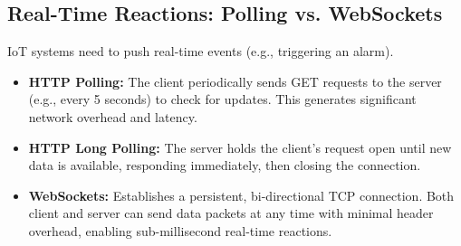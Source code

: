 \documentclass[12pt,a4paper]{article}
\begin{document}
\subsection{Real-Time Reactions: Polling vs. WebSockets}
IoT systems need to push real-time events (e.g., triggering an alarm).
\begin{itemize}[leftmargin=*, itemsep=3.5pt]
  \item \textbf{HTTP Polling:} The client periodically sends GET requests to the server (e.g., every 5 seconds) to check for updates. This generates significant network overhead and latency.
  \item \textbf{HTTP Long Polling:} The server holds the client's request open until new data is available, responding immediately, then closing the connection.
  \item \textbf{WebSockets:} Establishes a persistent, bi-directional TCP connection. Both client and server can send data packets at any time with minimal header overhead, enabling sub-millisecond real-time reactions.
\end{itemize}
\end{document}

